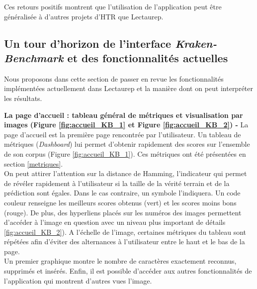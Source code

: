 Ces retours positifs montrent que l'utilisation de l'application peut être généralisée à d'autres projets d'HTR que Lectaurep.\\
\newpage
\subsection{Un tour d'horizon de l'interface \textit{Kraken-Benchmark} et des fonctionnalités actuelles}\label{inter_fonc}
Nous proposons dans cette section de passer en revue les fonctionnalités implémentées actuellement dans Lectaurep et la manière dont on peut interpréter les résultats.

\textbf{La page d'accueil : tableau général de métriques et visualisation par images (Figure \ref{fig:accueil_KB_1} et Figure \ref{fig:accueil_KB_2}) - } La page d'accueil est la première page rencontrée par l'utilisateur. Un tableau de métriques (\textit{Dashboard}) lui permet d'obtenir rapidement des scores sur l'ensemble de son corpus (Figure \ref{fig:accueil_KB_1}). Ces métriques ont été présentées en section \ref{metriques}. \\On peut attirer l'attention sur la distance de Hamming, l'indicateur qui permet de révéler rapidement à l'utilisateur si la taille de la vérité terrain et de la prédiction sont égales. Dans le cas contraire, un symbole \inquote{$\emptyset$} l'indiquera. Un code couleur renseigne les meilleurs scores obtenus (vert) et les scores moins bons (rouge). De plus, des hyperliens placés sur les numéros des images permettent d'accéder à l'image en question avec un niveau plus important de détails \ref{fig:accueil_KB_2}). 
A l'échelle de l'image, certaines métriques du tableau sont répétées afin d'éviter des alternances à l'utilisateur entre le haut et le bas de la page.\\ Un premier graphique montre le nombre de caractères exactement reconnus, supprimés et insérés. Enfin, il est possible d'accéder aux autres fonctionnalités de l'application qui montrent d'autres vues l'image.

